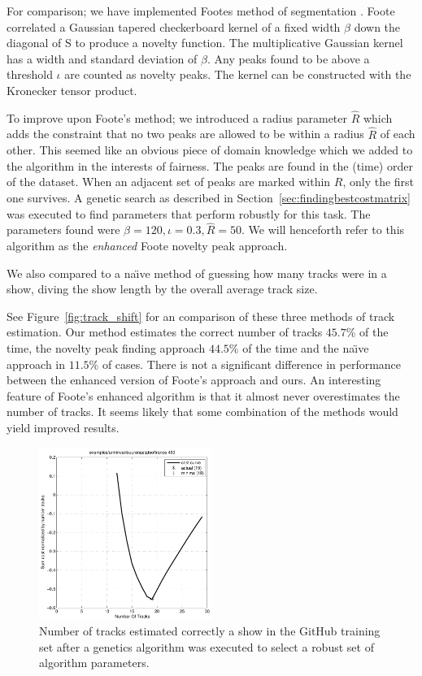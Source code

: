 \documentclass[twocolumn]{article}
\begin{document}
For comparison; we have implemented Footes method of segmentation \citep{foote2003media}. Foote correlated a Gaussian tapered checkerboard kernel of a fixed width $\beta$ down the diagonal of S to produce a novelty function. The multiplicative Gaussian kernel has a width and standard deviation of $\beta$.  Any peaks found to be above a threshold $\iota$ are counted as novelty peaks. The kernel can be constructed with the Kronecker tensor product.

To improve upon Foote's method; we introduced a radius parameter $\hat R$ which adds the constraint that no two peaks are allowed to be within a radius $\hat R$ of each other. This seemed like an obvious piece of domain knowledge which we added to the algorithm in the interests of fairness. The peaks are found in the (time) order of the dataset. When an adjacent set of peaks are marked within $R$, only the first one survives. A genetic search as described in Section~\ref{sec:findingbestcostmatrix} was executed to find parameters that perform robustly for this task. The parameters found were $\beta=120, \iota=0.3, \hat R=50$. We will henceforth refer to this algorithm as the \textit{enhanced} Foote novelty peak approach.

We also compared to a na\"{\i}ve method of guessing how many tracks were in a show, diving the show length by the overall average track size.

See Figure~\ref{fig:track_shift} for an comparison of these three methods of track estimation. Our method estimates the correct number of tracks $45.7$\% of the time, the novelty peak finding approach $44.5$\% of the time and the na\"{\i}ve approach in $11.5$\% of cases. There is not a significant difference in performance between the enhanced version of Foote's approach and ours. An interesting feature of Foote's enhanced algorithm is that it almost never overestimates the number of tracks. It seems likely that some combination of the methods would yield improved results. 


\begin{figure}
	\centering
	\includegraphics[width=0.5\textwidth]{images/trackestimate}
	\caption{Number of tracks estimated correctly a show in the GitHub training set after a genetics algorithm was executed to select a robust set of algorithm parameters.}
	\label{fig:github_trackestimation}
\end{figure}
\end{document}
